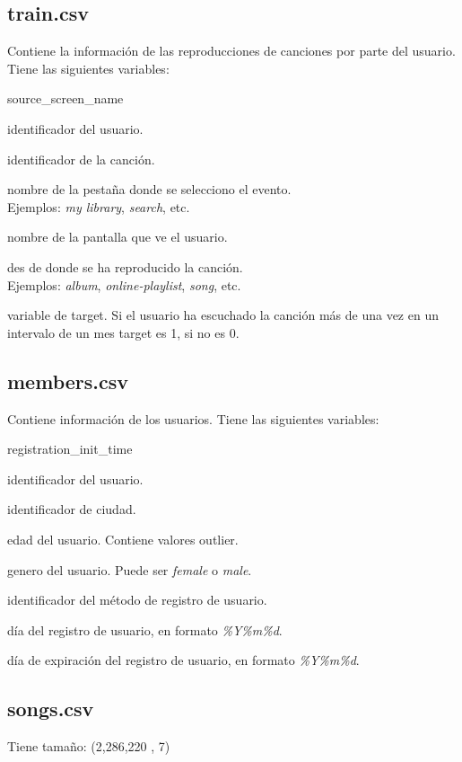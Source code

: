 \documentclass[a4paper]{article}
\begin{document}
\subsection*{train.csv}
Contiene la información de las reproducciones de canciones por parte del usuario. Tiene las siguientes variables:
\begin{labeling}{source\_screen\_name}
\item [msno] identificador del usuario.
\item [song\_id] identificador de la canción.
\item [source\_system\_tab] nombre de la pestaña donde se selecciono el evento.\\ Ejemplos: \textit{my library}, \textit{search}, etc.
\item [source\_screen\_name] nombre de la pantalla que ve el usuario.
\item [source\_type] des de donde se ha reproducido la canción.\\ Ejemplos: \textit{album}, \textit{online-playlist}, \textit{song}, etc.
\item [target] variable de target. Si el usuario ha escuchado la canción más de una vez en un intervalo de un mes target es 1, si no es 0.
\end{labeling}

\subsection*{members.csv}
Contiene información de los usuarios. Tiene las siguientes variables:
\begin{labeling}{registration\_init\_time}
\item [msno] identificador del usuario.
\item [city] identificador de ciudad.
\item [bd] edad del usuario. Contiene valores outlier.
\item [gender] genero del usuario. Puede ser \textit{female} o \textit{male}.
\item [registered\_via] identificador del método de registro de usuario.
\item [registration\_init\_time] día del registro de usuario, en formato \textit{\%Y\%m\%d}.
\item [expiration\_date] día de expiración del registro de usuario, en formato \textit{\%Y\%m\%d}.
\end{labeling}

\subsection*{songs.csv}
Tiene tamaño: (2,286,220 , 7)
\end{document}
